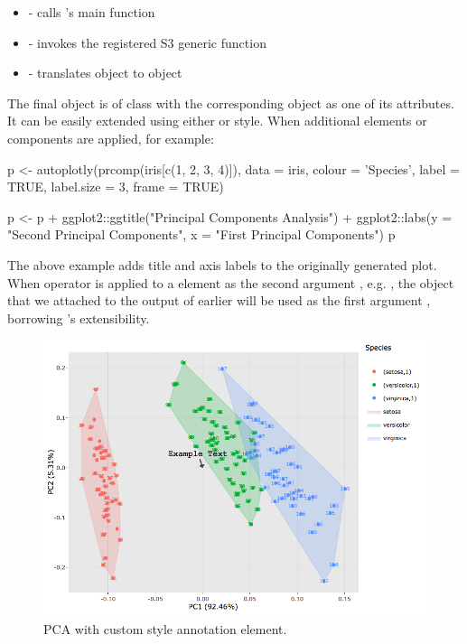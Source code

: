 \begin{itemize}
\tightlist
\item
   - calls 's main
  function
\item
   - invokes the registered S3
  generic function
\item
   - translates
   object to  object
\end{itemize}

The final object is of class  with the corresponding
 object as one of its attributes. It can be easily extended
using either  or  style. When additional
 elements or components are applied, for example:

\begin{Schunk}
\begin{Sinput}
p <- autoplotly(prcomp(iris[c(1, 2, 3, 4)]), data = iris,
  colour = 'Species', label = TRUE, label.size = 3, frame = TRUE)

p <- p +
  ggplot2::ggtitle("Principal Components Analysis") +
  ggplot2::labs(y = "Second Principal Components", x = "First Principal Components")
p
\end{Sinput}
\end{Schunk}

The above example adds title and axis labels to the originally generated
plot. When  operator is applied to a
 element as the second argument , e.g.
, the  object that we attached
to the output of  earlier will be used as the first
argument , borrowing 's extensibility.

\begin{figure}[htbp]
  \centering
  \includegraphics[width=145mm,scale=0.8]{images/pca_plotly_annotation.png}
  \caption{PCA with custom  style annotation element.}
  \label{figure:pca_plotly_annotation}
\end{figure}

